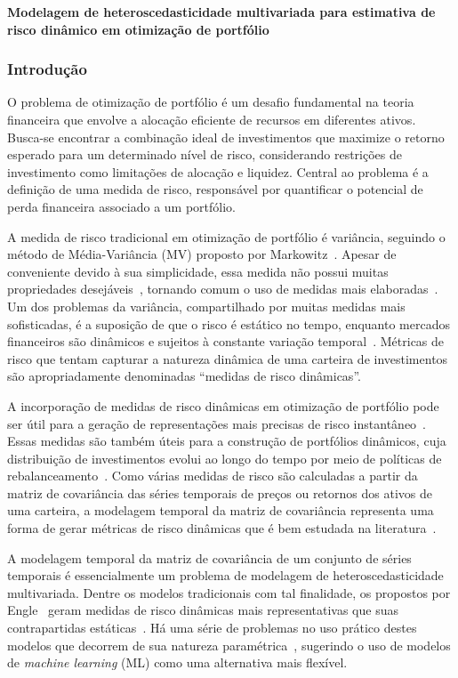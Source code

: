 \documentclass[a4paper, 12pt]{article}
\begin{document}
\textbf{Modelagem de heteroscedasticidade multivariada para estimativa de risco
dinâmico em otimização de portfólio}
\subsubsection*{Introdução}
\begin{spacing}{.9}

O problema de otimização de portfólio é um desafio fundamental na teoria
financeira que envolve a alocação eficiente de recursos em diferentes
ativos. Busca-se encontrar a combinação ideal de investimentos que maximize
o retorno esperado para um determinado nível de risco, considerando
restrições de investimento como limitações de alocação e liquidez. Central
ao problema é a definição de uma medida de risco, responsável por
quantificar o potencial de perda financeira associado a um portfólio.%

A medida de risco tradicional em otimização de portfólio é variância, seguindo
o método de Média-Variância (MV) proposto por Markowitz~\cite{markowitz}.
Apesar de conveniente devido à sua simplicidade, essa medida não possui
muitas propriedades desejáveis~\cite{rachev}, tornando comum o uso de
medidas mais elaboradas~\cite{gambrah2014risk}. Um dos problemas da
variância, compartilhado por muitas medidas mais sofisticadas, é a
suposição de que o risco é estático no tempo, enquanto mercados financeiros são
dinâmicos e sujeitos à constante variação temporal~\cite{procacci}.
Métricas de risco que tentam capturar a natureza dinâmica de uma carteira
de investimentos são apropriadamente denominadas ``medidas de risco
dinâmicas''.

A incorporação de medidas de risco dinâmicas em otimização de portfólio pode
ser útil para a geração de representações mais precisas de risco
instantâneo~\cite{chan1999portfolio}. Essas medidas são também úteis para a
construção de portfólios dinâmicos, cuja distribuição de investimentos
evolui ao longo do tempo por meio de políticas de
rebalanceamento~\cite{metin, holten}. Como várias medidas de risco são
calculadas a partir da matriz de covariância das séries temporais de preços
ou retornos dos ativos de uma carteira, a modelagem temporal da matriz de
covariância representa uma forma de gerar métricas de risco dinâmicas que é bem
estudada na literatura~\cite{chan1999portfolio}.

A modelagem temporal da matriz de covariância de um conjunto de séries
temporais é essencialmente um problema de modelagem de heteroscedasticidade
multivariada. Dentre os modelos tradicionais com tal finalidade, os propostos
por Engle~\cite{bauwens} geram medidas de risco dinâmicas mais representativas
que suas contrapartidas estáticas~\cite{metin, holten, weirum}. Há uma série de
problemas no uso prático destes modelos que decorrem de sua natureza
paramétrica~\cite{morettin}, sugerindo o uso de modelos de \emph{machine
learning} (ML) como uma alternativa mais flexível.


\end{spacing}
\end{document}
